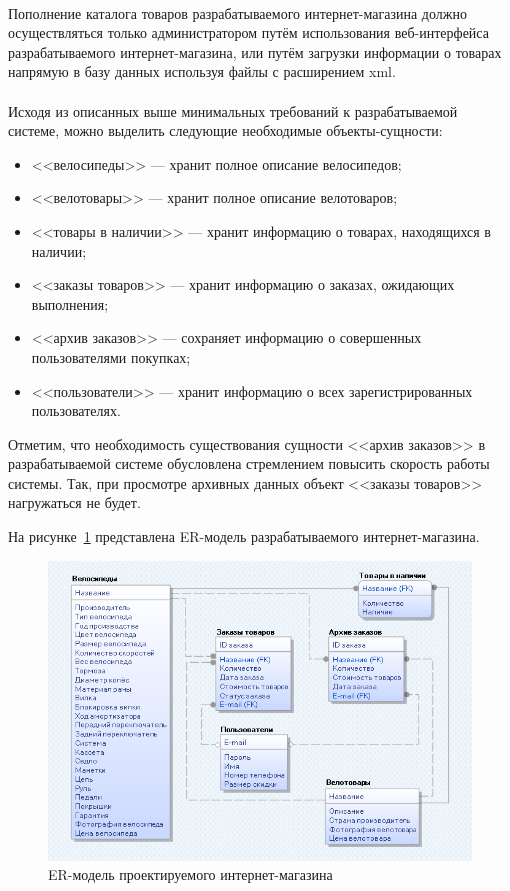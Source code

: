 \paragraph{}
Пополнение каталога товаров разрабатываемого интернет-магазина должно осуществляться
только администратором путём использования веб-интерфейса разрабатываемого
интернет-магазина, или путём загрузки информации
о товарах напрямую в базу данных используя файлы с расширением xml.

\paragraph{}
Исходя из описанных выше минимальных требований к разрабатываемой
системе, можно выделить следующие необходимые объекты-сущности:
\begin{itemize}
  \item <<велосипеды>> --- хранит полное описание велосипедов;
  \item <<велотовары>> --- хранит полное описание велотоваров;
  \item <<товары в наличии>> --- хранит информацию о товарах, находящихся в наличии;
  \item <<заказы товаров>> --- хранит информацию о заказах, ожидающих выполнения;
  \item <<архив заказов>> --- сохраняет информацию о совершенных пользователями
    покупках;
  \item <<пользователи>> --- хранит информацию о всех зарегистрированных пользователях.
\end{itemize}

Отметим, что необходимость существования сущности <<архив заказов>> в разрабатываемой
системе обусловлена стремлением повысить скорость работы системы. Так, при просмотре
архивных данных объект <<заказы товаров>> нагружаться не будет.

\pagebreak

На рисунке~\ref{fig:ER_model} представлена ER-модель
разрабатываемого интернет-магазина.

\begin{figure}[h]
  \centering
  \includegraphics[width=150mm]{pic/ER.png}
  \caption{ER-модель проектируемого интернет-магазина}
  \label{fig:ER_model}
\end{figure}

